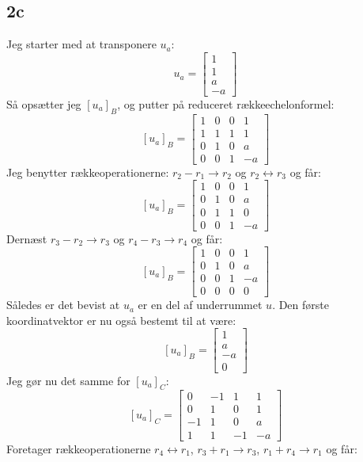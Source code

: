 \documentclass{article}
\begin{document}
\subsection*{2c}
Jeg starter med at transponere $u_a$:
$$
u_a=\left[\begin{array}{c}
1 \\
1 \\
a \\
-a
\end{array}\right]
$$
Så opsætter jeg $\left[u_a\right]_B$, og putter på reduceret rækkeechelonformel:
$$
\left[u_a\right]_B=\left[\begin{array}{ccc|c}
1 & 0 & 0 & 1 \\
1 & 1 & 1 & 1 \\
0 & 1 & 0 & a \\
0 & 0 & 1 & -a
\end{array}\right]
$$
Jeg benytter rækkeoperationerne: $r_2-r_1 \rightarrow r_2$ og $r_2 \leftrightarrow r_3$ og får:
$$\left[u_a\right]_B=\left[\begin{array}{ccc|c}1 & 0 & 0 & 1 \\ 0 & 1 & 0 & a \\ 0 & 1 & 1 & 0 \\ 0 & 0 & 1 & -a\end{array}\right]$$
Dernæst $r_3-r_2 \rightarrow r_3$ og $r_4-r_3 \rightarrow r_4$ og får:
$$
\left[u_a\right]_B=\left[\begin{array}{ccc|c}
1 & 0 & 0 & 1 \\
0 & 1 & 0 & a \\
0 & 0 & 1 & -a \\
0 & 0 & 0 & 0
\end{array}\right]
$$
Således er det bevist at $u_a$ er en del af underrummet $u$. Den første koordinatvektor er nu også bestemt til at være:
$$
\left[u_a\right]_B=\left[\begin{array}{c}
1 \\
a \\
-a \\
0
\end{array}\right]
$$
Jeg gør nu det samme for $\left[u_a\right]_C$:
$$
\left[u_a\right]_C=\left[\begin{array}{ccc|c}
0 & -1 & 1 & 1 \\
0 & 1 & 0 & 1 \\
-1 & 1 & 0 & a \\
1 & 1 & -1 & -a
\end{array}\right]
$$
Foretager rækkeoperationerne $r_4 \longleftrightarrow r_1$, $r_3+r_1 \rightarrow r_3$, $r_1+r_4 \rightarrow r_1$ og får:
\end{document}

